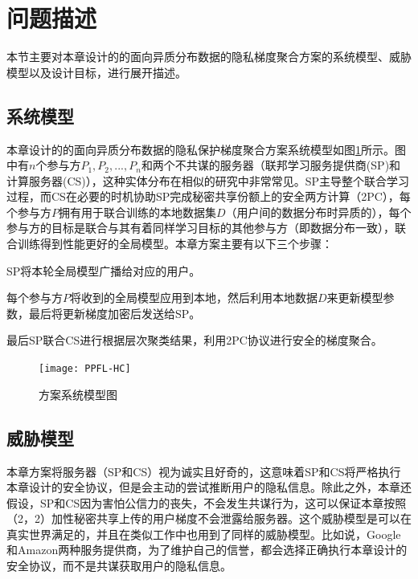\section{问题描述}\label{4-problem}
本节主要对本章设计的的面向异质分布数据的隐私梯度聚合方案的系统模型、威胁模型以及设计目标，进行展开描述。

\subsection{系统模型}
本章设计的的面向异质分布数据的隐私保护梯度聚合方案系统模型如图\ref{sysjpg}所示。图中有$n$个参与方$P_1,P_2,...,P_n$和两个不共谋的服务器（联邦学习服务提供商(SP)和计算服务器(CS)），这种实体分布在相似的研究\cite{liu2021privacy, dong2021flod, hao2021efficient}中非常常见。SP主导整个联合学习过程，而CS在必要的时机协助SP完成秘密共享份额上的安全两方计算（2PC），每个参与方$P$拥有用于联合训练的本地数据集$D$（用户间的数据分布时异质的），每个参与方的目标是联合与其有着同样学习目标的其他参与方（即数据分布一致），联合训练得到性能更好的全局模型。本章方案主要有以下三个步骤：
\begin{compactenum}
    \item SP将本轮全局模型广播给对应的用户。
    \item 每个参与方$P$将收到的全局模型应用到本地，然后利用本地数据$D$来更新模型参数，最后将更新梯度加密后发送给SP。
    \item 最后SP联合CS进行根据层次聚类结果，利用2PC协议进行安全的梯度聚合。
\end{compactenum}


\begin{figure}[htbp]
    \begin{center}
        \texttt{[image: PPFL-HC]}
        \caption{方案系统模型图}
        \label{sysjpg}
    \end{center}
\end{figure}

\subsection{威胁模型}
本章方案将服务器（SP和CS）视为诚实且好奇的，这意味着SP和CS将严格执行本章设计的安全协议，但是会主动的尝试推断用户的隐私信息。除此之外，本章还假设，SP和CS因为害怕公信力的丧失，不会发生共谋行为，这可以保证本章按照（2，2）加性秘密共享上传的用户梯度不会泄露给服务器。这个威胁模型是可以在真实世界满足的，并且在类似工作\cite{nguyen2022flame}中也用到了同样的威胁模型。比如说，Google和Amazon两种服务提供商，为了维护自己的信誉，都会选择正确执行本章设计的安全协议，而不是共谋获取用户的隐私信息。

